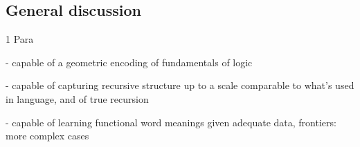 \subsection{General discussion}  %



1 Para

- capable of a geometric encoding of fundamentals of logic 

- capable of capturing recursive structure up to a scale comparable to what's used in language, and of true recursion

- capable of learning functional word meanings given adequate data, frontiers: more complex cases
